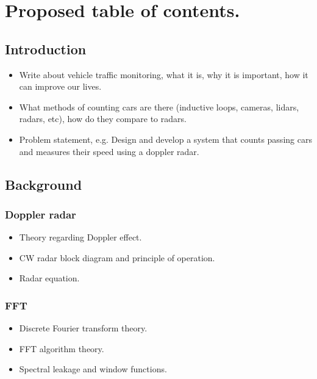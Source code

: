 \documentclass[12pt]{article}
\begin{document}
\section*{Proposed table of contents.}
 
\subsection{Introduction}

\begin{itemize}

\item Write about vehicle traffic monitoring, what it is, why it is important, how it can improve our lives.

\item What methods of counting cars are there (inductive loops, cameras, lidars, radars, etc), how do they compare to radars.

\item Problem statement, e.g. Design and develop a system that counts passing cars and measures their speed using a doppler radar.

\end{itemize}


\subsection{Background}

\subsubsection{Doppler radar}

\begin{itemize}

\item Theory regarding Doppler effect.

\item CW radar block diagram and principle of operation.

\item Radar equation.

\end{itemize}

\subsubsection{FFT}

\begin{itemize}

\item Discrete Fourier transform theory.

\item FFT algorithm theory.

\item Spectral leakage and window functions.

\end{itemize}
\end{document}

